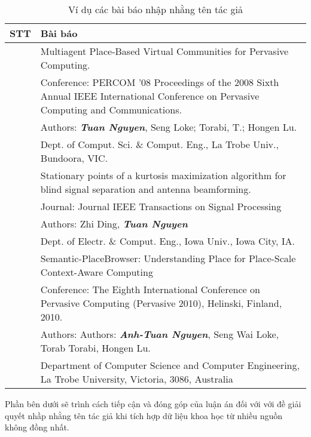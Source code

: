 \begin{table}[ht]
\centering
    \caption{Ví dụ các bài báo nhập nhằng tên tác giả}\label{tab:table_A_3}
    \begin{tabular}{ p{0.8cm} | p{12.9cm}}
    \hline
     \centering \textbf{STT} & \textbf{Bài báo}\\
    \hline
     \centering \multirow{4}{*}{1} & Multiagent Place-Based Virtual Communities for Pervasive Computing. \\
     & Conference: PERCOM '08 Proceedings of the 2008 Sixth Annual IEEE International Conference on Pervasive Computing and Communications. \\
     & Authors: \textbf{\textit{Tuan Nguyen}}, Seng Loke; Torabi, T.; Hongen Lu.\\
     & Dept. of Comput. Sci. \& Comput. Eng., La Trobe Univ., Bundoora, VIC.\\
    \hline
    \centering \multirow{4}{*}{2} & Stationary points of a kurtosis maximization algorithm for blind signal separation and antenna beamforming. \\   
    & Journal: Journal IEEE Transactions on Signal Processing \\
    & Authors: Zhi Ding, \textbf{\textit{Tuan Nguyen}}\\
    & Dept. of Electr. \& Comput. Eng., Iowa Univ., Iowa City, IA.\\
    \hline
    \centering \multirow{4}{*}{3} & Semantic-PlaceBrowser: Understanding Place for Place-Scale Context-Aware Computing \\   
	& Conference: The Eighth International Conference on Pervasive Computing (Pervasive 2010), Helinski, Finland, 2010. \\
    & Authors: Authors: \textbf{\textit{Anh-Tuan Nguyen}}, Seng Wai Loke, Torab Torabi, Hongen Lu.\\
    & Department of Computer Science and Computer Engineering, La Trobe University, Victoria, 3086, Australia\\
    \end{tabular}
\end{table}

Phần bên dưới sẽ trình cách tiếp cận và đóng góp của luận án đối với với đề giải quyết nhầp nhằng tên tác giả khi tích hợp dữ liệu khoa học từ nhiều nguồn không đồng nhất.

